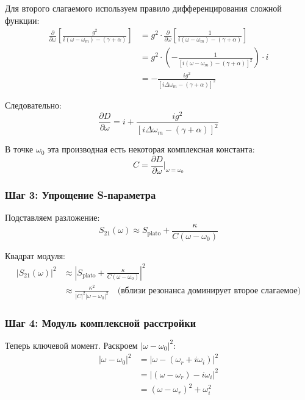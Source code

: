 \documentclass[12pt,a4paper]{article}
\begin{document}
Для второго слагаемого используем правило дифференцирования сложной функции:
\begin{align}
\frac{\partial}{\partial \omega}\left[\frac{g^2}{i(\omega - \omega_m) - (\gamma+\alpha)}\right] &= g^2 \cdot \frac{\partial}{\partial \omega}\left[\frac{1}{i(\omega - \omega_m) - (\gamma+\alpha)}\right] \nonumber \\
&= g^2 \cdot \left(-\frac{1}{[i(\omega - \omega_m) - (\gamma+\alpha)]^2}\right) \cdot i \nonumber \\
&= -\frac{ig^2}{[i\Delta\omega_m - (\gamma+\alpha)]^2}
\end{align}

Следовательно:
\begin{equation}
\frac{\partial D}{\partial \omega} = i + \frac{ig^2}{[i\Delta\omega_m - (\gamma+\alpha)]^2}
\end{equation}

В точке $\omega_0$ эта производная есть некоторая комплексная константа:
\begin{equation}
C = \frac{\partial D}{\partial \omega}\bigg|_{\omega=\omega_0}
\end{equation}

\subsubsection{Шаг 3: Упрощение S-параметра}

Подставляем разложение:
\begin{equation}
S_{21}(\omega) \approx S_{\text{plato}} + \frac{\kappa}{C(\omega - \omega_0)}
\end{equation}

Квадрат модуля:
\begin{align}
|S_{21}(\omega)|^2 &\approx \left|S_{\text{plato}} + \frac{\kappa}{C(\omega - \omega_0)}\right|^2 \nonumber \\
&\approx \frac{\kappa^2}{|C|^2|\omega - \omega_0|^2} \quad \text{(вблизи резонанса доминирует второе слагаемое)}
\end{align}

\subsubsection{Шаг 4: Модуль комплексной расстройки}

Теперь ключевой момент. Раскроем $|\omega - \omega_0|^2$:
\begin{align}
|\omega - \omega_0|^2 &= |\omega - (\omega_r + i\omega_i)|^2 \nonumber \\
&= |(\omega - \omega_r) - i\omega_i|^2 \nonumber \\
&= (\omega - \omega_r)^2 + \omega_i^2
\end{align}
\end{document}
